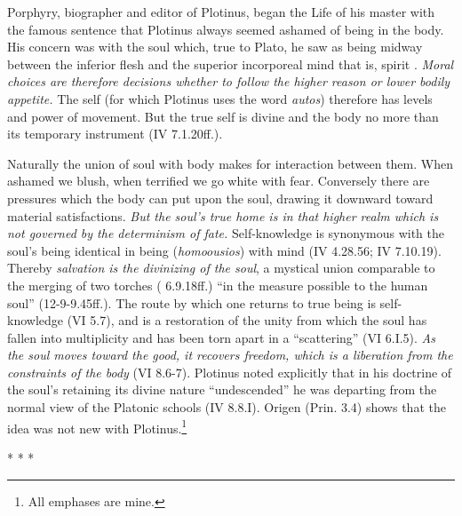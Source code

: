 \begin{quotationx}
Porphyry, biographer and editor of Plotinus, began the Life of his master with the famous sentence that Plotinus always seemed ashamed of being in the body. His concern was with the soul which, true to Plato, he saw as being midway between the inferior flesh and the superior incorporeal mind that is, spirit . \emph{Moral choices are therefore decisions whether to follow the higher reason or lower bodily appetite.} The self (for which Plotinus uses the word \emph{autos}) therefore has levels and power of movement. But the true self is divine and the body no more than its temporary instrument (IV 7.1.20ff.).

Naturally the union of soul with body makes for interaction between them. When ashamed we blush, when terrified we go white with fear. Conversely there are pressures which the body can put upon the soul, drawing it downward toward material satisfactions. \emph{But the soul's true home is in that higher realm which is not governed by the determinism of fate.} Self-knowledge is synonymous with the soul's being identical in being (\emph{homoousios}) with mind (IV 4.28.56; IV 7.10.19). Thereby \emph{salvation is the divinizing of the soul}, a mystical union comparable to the merging of two torches ( 6.9.18ff.) ``in the measure possible to the human soul'' (12-9-9.45ff.). The route by which one returns to true being is self-knowledge (VI 5.7), and is a restoration of the unity from which the soul has fallen into multiplicity and has been torn apart in a ``scattering'' (VI 6.I.5).
\emph{As the soul moves toward the good, it recovers freedom, which is a liberation from the constraints of the body} (VI 8.6-7). Plotinus noted explicitly that in his doctrine of the soul's retaining its divine nature ``undescended'' he was departing from the normal view of the Platonic schools (IV 8.8.I). Origen (Prin. 3.4) shows that the idea was not new with Plotinus.\footnote{All emphases are mine.}
\end{quotationx}




\begin{center}* * *\end{center}

